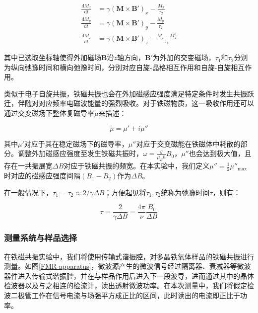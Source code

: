\documentclass{thuemp}
\begin{document}
    \begin{equation}
    \begin{aligned}
        \frac{\mathrm{d} M_x}{\mathrm{d} t} &= \gamma (\symbf{M} \times \symbf{B'})_x - \frac{M_x}{\tau_2} \\
        \frac{\mathrm{d} M_y}{\mathrm{d} t} &= \gamma (\symbf{M} \times \symbf{B'})_y - \frac{M_y}{\tau_2} \\
        \frac{\mathrm{d} M_z}{\mathrm{d} t} &= \gamma (\symbf{M} \times \symbf{B'})_z - \frac{M_z - M_z^0}{\tau_1}
    \end{aligned}
    \end{equation}
    
    其中已选取坐标轴使得外加磁场$\mathbf{B}$沿$z$轴方向，$\symbf{B'}$为外加的交变磁场，$\tau_1$和$\tau_2$分别为纵向弛豫时间和横向弛豫时间，分别对应自旋-晶格相互作用和自旋-自旋相互作用。
    
    类似于电子自旋共振，铁磁共振也会在外加磁感应强度满足特定条件时发生共振跃迁，伴随对对应频率电磁波能量的强烈吸收。对于铁磁物质，这一吸收作用还可以通过交变磁场下整体复磁导率$\tilde\mu $来描述：
    
    \begin{equation}
        \tilde\mu = \mu' + i\mu''
    \end{equation}
    
    其中$\mu'$对应于其在稳定磁场下的磁导率，$\mu''$对应于交变磁能在铁磁体中耗散的部分。调整外加磁感应强度至发生铁磁共振时，$\omega = \frac{g}{\mu_B\hbar} B_0$，$\mu''$也会达到极大值，且存在一共振展宽$\Delta B$对应于铁磁共振的频宽。在本实验中，我们定义$\mu'' = \frac 1 2 \mu''_{\mathrm{max}}$时对应的磁感应强度间隔$(B_1 - B_2)$作为$\Delta B$。
    
    在一般情况下，$\tau_1 = \tau_2 \approx 2/\gamma \Delta B$；方便起见将$\tau_1, \tau_2$统称为弛豫时间$\tau$，则有：
    
    \begin{equation}
        \tau = \frac{2}{\gamma\Delta B} = \frac{4\pi}{\nu}\frac{B_0}{\Delta B}
    \end{equation}
    
    
    
    \subsubsection{测量系统与样品选择}
    
    在铁磁共振实验中，我们将使用传输式谐振腔，对多晶铁氧体样品的铁磁共振进行测量。如图\ref{FMR-apparatus}，微波源产生的微波信号经过隔离器、衰减器等微波器件进入传输式谐振腔，并在与样品作用后进入下一段波导，进而通过其中的晶体检波器以及与之相连的检流计，读出透射微波功率。在本次测量中，我们将假定检波二极管工作在信号电流与场强平方成正比的区间，此时读出的电流即正比于功率。
    
\end{document}
